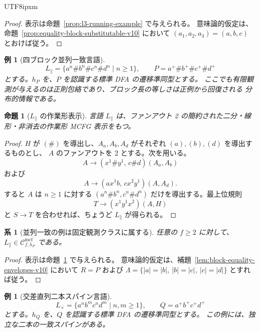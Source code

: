 \documentclass[10pt,a4paper]{article}
\newtheorem{proposition}[theorem]{命題}
\newtheorem{corollary}[theorem]{系}
\newtheorem{example}[theorem]{例}
\theoremstyle{remark}
\newcommand{\Cmcf}[2]{\mathcal{C}^{\mathrm{mcf}}_{#1,#2}}
\begin{document}
\begin{CJK}{UTF8}{ipxm}
\begin{proof}
表示は命題~\ref{prop:l3-running-example} で与えられる。
意味論的仮定は、命題~\ref{prop:equality-block-substitutable-v10} において
\((a_1,a_2,a_3)=(a,b,c)\) とおけば従う。
\end{proof}

\begin{example}[四ブロック並列一致言語]
\label{ex:parallel-language}
\[
  L_{\parallel}=\{a^n\#b^n\#c^n\#d^n\mid n\ge1\},
  \qquad P=a^+\#b^+\#c^+\#d^+
\]
とする。\(h_P\) を、\(P\) を認識する標準 DFA の遷移準同型とする。
ここでも有限観測が与えるのは正則包絡であり、ブロック長の等しさは正例から回復される
分布的情報である。
\end{example}

\begin{proposition}[\(L_{\parallel}\) の作業形表示]
\label{prop:parallel-running-example}
言語 \(L_{\parallel}\) は、ファンアウト 2 の簡約された二分・線形・非消去の作業形 MCFG 表示をもつ。
\end{proposition}

\begin{proof}
\(H\) が \((\#)\) を導出し、\(A_a,A_b,A_d\) がそれぞれ \((a),(b),(d)\) を導出するものとし、
\(A\) のファンアウトを 2 とする。次を用いる。
\[
  A\to(x^1\#y^1,\,c\#d)(A_a,A_b)
\]
および
\[
  A\to(a x^1 b,\,c x^2 y^1)(A,A_d).
\]
すると \(A\) は \(n\ge1\) に対する
\((a^n\#b^n,c^n\#d^n)\) だけを導出する。最上位規則
\[
  T\to(x^1y^1x^2)(A,H)
\]
と \(S\to T\) を合わせれば、ちょうど \(L_{\parallel}\) が得られる。
\end{proof}

\begin{corollary}[並列一致の例は固定観測クラスに属する]
\label{cor:parallel-in-fixed-observation-class}
任意の \(f\ge2\) に対して、\(L_{\parallel}\in\Cmcf{f}{h_P}\) である。
\end{corollary}

\begin{proof}
表示は命題~\ref{prop:parallel-running-example} で与えられる。
意味論的仮定は、補題~\ref{lem:block-equality-envelopes-v10} において
\(R=P\) および
\(\Lambda=\{|a|=|b|,\ |b|=|c|,\ |c|=|d|\}\) とすれば従う。
\end{proof}

\begin{example}[交差直列二本スパイン言語]
\label{ex:cross-serial-language}
\[
  L_{\times}=\{a^n b^m c^n d^m\mid n,m\ge1\},
  \qquad Q=a^+b^+c^+d^+
\]
とする。\(h_Q\) を、\(Q\) を認識する標準 DFA の遷移準同型とする。
この例には、独立な二本の一致スパインがある。
\end{example}


\end{CJK}
\end{document}
